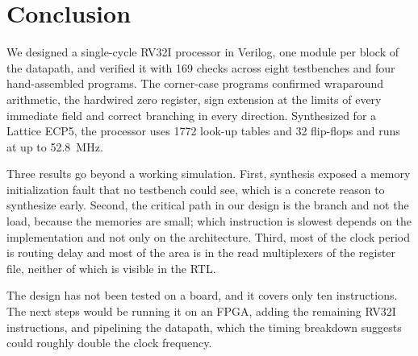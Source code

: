 \documentclass[conference]{IEEEtran}
\begin{document}
\section{Conclusion}
We designed a single-cycle RV32I processor in Verilog, one module per block
of the datapath, and verified it with 169 checks across eight testbenches
and four hand-assembled programs. The corner-case programs confirmed
wraparound arithmetic, the hardwired zero register, sign extension at the
limits of every immediate field and correct branching in every direction.
Synthesized for a Lattice ECP5, the processor uses 1772 look-up tables and
32 flip-flops and runs at up to 52.8~MHz.

Three results go beyond a working simulation. First, synthesis exposed a
memory initialization fault that no testbench could see, which is a concrete
reason to synthesize early. Second, the critical path in our design is the
branch and not the load, because the memories are small; which instruction
is slowest depends on the implementation and not only on the architecture.
Third, most of the clock period is routing delay and most of the area is in
the read multiplexers of the register file, neither of which is visible in
the RTL.

The design has not been tested on a board, and it covers only ten
instructions. The next steps would be running it on an FPGA, adding the
remaining RV32I instructions, and pipelining the datapath, which the timing
breakdown suggests could roughly double the clock frequency.
\end{document}
